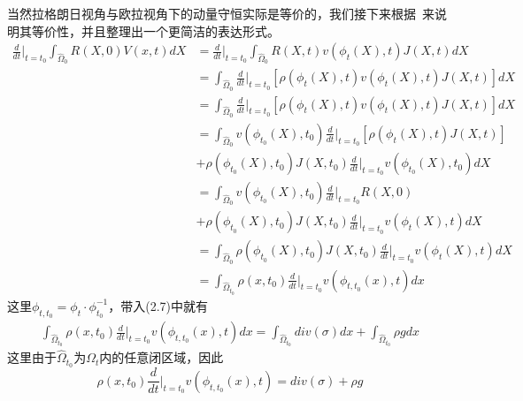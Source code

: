 当然拉格朗日视角与欧拉视角下的动量守恒实际是等价的，我们接下来根据~\cite{gonzalez2008first}来说明其等价性，并且整理出一个更简洁的表达形式。
\begin{equation}
    \begin{split}
        \frac{d}{dt}\Big |_{t = t_0}\int_{\hat{\Omega}_0}R(X,0)V(x,t)dX &= \frac{d}{dt}\Big |_{t = t_0} \int_{\hat{\Omega}_0}R(X,t)v(\phi_t(X),t)J(X,t)dX\\
        &=\int_{\hat{\Omega}_0} \frac{d}{dt}\Big |_{t = t_0} [\rho(\phi_t(X),t)v(\phi_t(X),t)J(X,t)]dX\\
        &=\int_{\hat{\Omega}_0} \frac{d}{dt}\Big |_{t = t_0} [\rho(\phi_t(X),t)v(\phi_t(X),t)J(X,t)]dX\\
        &=\int_{\hat{\Omega}_0} v(\phi_{t_0}(X),t_0)\frac{d}{dt}\Big |_{t = t_0}[\rho(\phi_t(X),t) J(X,t)] \\
        &+ \rho(\phi_{t_0}(X),{t_0})J(X,t_0)\frac{d}{dt}\Big |_{t = t_0} v(\phi_{t_0}(X),t_0) dX\nonumber\\
        &=\int_{\hat{\Omega}_0}v(\phi_{t_0}(X),t_0)\frac{d}{dt}\Big |_{t = t_0}R(X,0) \\
        &+ \rho(\phi_{t_0}(X),{t_0})J(X,t_0)\frac{d}{dt}\Big |_{t = t_0} v(\phi_{t}(X),t)dX\\
        &=\int_{\hat{\Omega}_0}\rho(\phi_{t_0}(X),{t_0})J(X,t_0)\frac{d}{dt}\Big |_{t = t_0} v(\phi_{t}(X),t)dX\\
        &=\int_{\hat{\Omega}_{t_0}}\rho(x,t_0)\frac{d}{dt}\Big |_{t = t_0} v(\phi_{t,t_0}(x),t)dx\nonumber
    \end{split}
\end{equation}
这里$\phi_{t,t_0} = \phi_t \cdot \phi_{t_0}^{-1}$，带入(2.7)中就有
\begin{equation}
    \begin{split}
        \int_{\hat{\Omega}_{t_0}}\rho(x,t_0)\frac{d}{dt}\Big |_{t = t_0} v(\phi_{t,t_0}(x),t)dx = \int_{\hat{\Omega}_{t_0}} div(\sigma) dx + \int_{\hat{\Omega}_{t_0}} \rho g dx\nonumber
    \end{split}
\end{equation}
这里由于$\hat{\Omega}_{t_0}$为$\Omega_t$内的任意闭区域，因此
$$\rho(x,t_0)\frac{d}{dt}\Big |_{t = t_0} v(\phi_{t,t_0}(x),t) = div(\sigma) + \rho g$$

